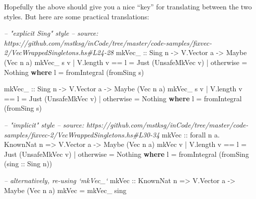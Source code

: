 \documentclass[]{article}
\newenvironment{Shaded}{}{}
\newcommand{\KeywordTok}[1]{\textcolor[rgb]{0.00,0.44,0.13}{\textbf{#1}}}
\newcommand{\DataTypeTok}[1]{\textcolor[rgb]{0.56,0.13,0.00}{#1}}
\newcommand{\CommentTok}[1]{\textcolor[rgb]{0.38,0.63,0.69}{\textit{#1}}}
\newcommand{\OtherTok}[1]{\textcolor[rgb]{0.00,0.44,0.13}{#1}}
\newcommand{\FunctionTok}[1]{\textcolor[rgb]{0.02,0.16,0.49}{#1}}
\newcommand{\NormalTok}[1]{#1}
\begin{document}
Hopefully the above should give you a nice ``key'' for translating between the
two styles. But here are some practical translations:

\begin{Shaded}
\begin{Highlighting}[]
\CommentTok{-- "explicit Sing" style}
\CommentTok{-- source: https://github.com/mstksg/inCode/tree/master/code-samples/fixvec-2/VecWrappedSingletons.hs#L24-28}
\OtherTok{mkVec_ ::} \DataTypeTok{Sing}\NormalTok{ n }\OtherTok{->} \DataTypeTok{V.Vector}\NormalTok{ a }\OtherTok{->} \DataTypeTok{Maybe}\NormalTok{ (}\DataTypeTok{Vec}\NormalTok{ n a)}
\NormalTok{mkVec_ s v }\FunctionTok{|}\NormalTok{ V.length v }\FunctionTok{==}\NormalTok{ l }\FunctionTok{=} \DataTypeTok{Just}\NormalTok{ (}\DataTypeTok{UnsafeMkVec}\NormalTok{ v)}
           \FunctionTok{|}\NormalTok{ otherwise       }\FunctionTok{=} \DataTypeTok{Nothing}
  \KeywordTok{where}
\NormalTok{    l }\FunctionTok{=}\NormalTok{ fromIntegral (fromSing s)}


\OtherTok{mkVec_ ::} \DataTypeTok{Sing}\NormalTok{ n }\OtherTok{->} \DataTypeTok{V.Vector}\NormalTok{ a }\OtherTok{->} \DataTypeTok{Maybe}\NormalTok{ (}\DataTypeTok{Vec}\NormalTok{ n a)}
\NormalTok{mkVec_ s v }\FunctionTok{|}\NormalTok{ V.length v }\FunctionTok{==}\NormalTok{ l }\FunctionTok{=} \DataTypeTok{Just}\NormalTok{ (}\DataTypeTok{UnsafeMkVec}\NormalTok{ v)}
           \FunctionTok{|}\NormalTok{ otherwise       }\FunctionTok{=} \DataTypeTok{Nothing}
  \KeywordTok{where}
\NormalTok{    l }\FunctionTok{=}\NormalTok{ fromIntegral (fromSing s)}


\CommentTok{-- "implicit" style}
\CommentTok{-- source: https://github.com/mstksg/inCode/tree/master/code-samples/fixvec-2/VecWrappedSingletons.hs#L30-34}
\OtherTok{mkVec ::}\NormalTok{ forall n a}\FunctionTok{.} \DataTypeTok{KnownNat}\NormalTok{ n }\OtherTok{=>} \DataTypeTok{V.Vector}\NormalTok{ a }\OtherTok{->} \DataTypeTok{Maybe}\NormalTok{ (}\DataTypeTok{Vec}\NormalTok{ n a)}
\NormalTok{mkVec v }\FunctionTok{|}\NormalTok{ V.length v }\FunctionTok{==}\NormalTok{ l }\FunctionTok{=} \DataTypeTok{Just}\NormalTok{ (}\DataTypeTok{UnsafeMkVec}\NormalTok{ v)}
        \FunctionTok{|}\NormalTok{ otherwise       }\FunctionTok{=} \DataTypeTok{Nothing}
  \KeywordTok{where}
\NormalTok{    l }\FunctionTok{=}\NormalTok{ fromIntegral (fromSing (}\OtherTok{sing ::} \DataTypeTok{Sing}\NormalTok{ n))}



\CommentTok{-- alternatively, re-using `mkVec_`}
\OtherTok{mkVec ::} \DataTypeTok{KnownNat}\NormalTok{ n }\OtherTok{=>} \DataTypeTok{V.Vector}\NormalTok{ a }\OtherTok{->} \DataTypeTok{Maybe}\NormalTok{ (}\DataTypeTok{Vec}\NormalTok{ n a)}
\NormalTok{mkVec }\FunctionTok{=}\NormalTok{ mkVec_ sing}
\end{Highlighting}
\end{Shaded}
\end{document}
